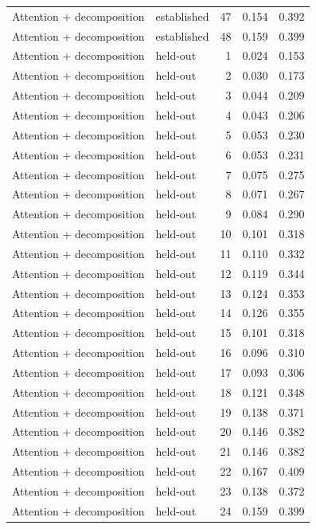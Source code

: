 \begin{tabular}{llrrr}
Attention + decomposition & established & 47 & 0.154 & 0.392 \\
Attention + decomposition & established & 48 & 0.159 & 0.399 \\
Attention + decomposition & held-out & 1 & 0.024 & 0.153 \\
Attention + decomposition & held-out & 2 & 0.030 & 0.173 \\
Attention + decomposition & held-out & 3 & 0.044 & 0.209 \\
Attention + decomposition & held-out & 4 & 0.043 & 0.206 \\
Attention + decomposition & held-out & 5 & 0.053 & 0.230 \\
Attention + decomposition & held-out & 6 & 0.053 & 0.231 \\
Attention + decomposition & held-out & 7 & 0.075 & 0.275 \\
Attention + decomposition & held-out & 8 & 0.071 & 0.267 \\
Attention + decomposition & held-out & 9 & 0.084 & 0.290 \\
Attention + decomposition & held-out & 10 & 0.101 & 0.318 \\
Attention + decomposition & held-out & 11 & 0.110 & 0.332 \\
Attention + decomposition & held-out & 12 & 0.119 & 0.344 \\
Attention + decomposition & held-out & 13 & 0.124 & 0.353 \\
Attention + decomposition & held-out & 14 & 0.126 & 0.355 \\
Attention + decomposition & held-out & 15 & 0.101 & 0.318 \\
Attention + decomposition & held-out & 16 & 0.096 & 0.310 \\
Attention + decomposition & held-out & 17 & 0.093 & 0.306 \\
Attention + decomposition & held-out & 18 & 0.121 & 0.348 \\
Attention + decomposition & held-out & 19 & 0.138 & 0.371 \\
Attention + decomposition & held-out & 20 & 0.146 & 0.382 \\
Attention + decomposition & held-out & 21 & 0.146 & 0.382 \\
Attention + decomposition & held-out & 22 & 0.167 & 0.409 \\
Attention + decomposition & held-out & 23 & 0.138 & 0.372 \\
Attention + decomposition & held-out & 24 & 0.159 & 0.399 \\

\end{tabular}
